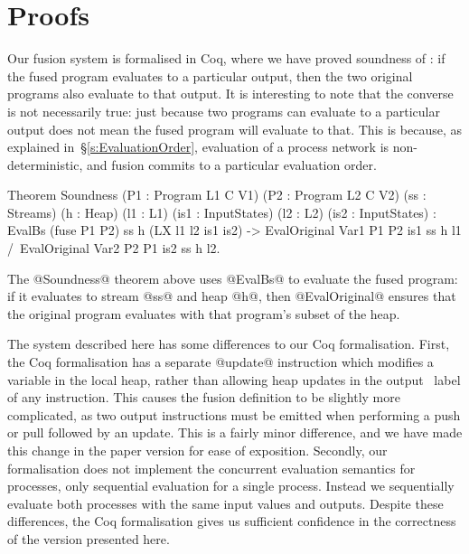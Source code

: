 
\section{Proofs}
\label{s:Proofs}

Our fusion system is formalised in Coq, where we have proved soundness of : if the fused program evaluates to a particular output, then the two original programs also evaluate to that output.
It is interesting to note that the converse is not necessarily true: just because two programs can evaluate to a particular output does not mean the fused program will evaluate to that.
This is because, as explained in~\S\ref{s:EvaluationOrder}, evaluation of a process network is non-deterministic, and fusion commits to a particular evaluation order.

\begin{code}
Theorem Soundness (P1 : Program L1 C V1) (P2 : Program L2 C V2) (ss : Streams) (h : Heap)
    (l1 : L1) (is1 : InputStates) (l2 : L2) (is2 : InputStates) :
  EvalBs (fuse P1 P2) ss h (LX l1 l2 is1 is2)
  -> EvalOriginal Var1 P1 P2 is1 ss h l1 /\ EvalOriginal Var2 P2 P1 is2 ss h l2.
\end{code}

The @Soundness@ theorem above uses @EvalBs@ to evaluate the fused program: if it evaluates to stream @ss@ and heap @h@, then @EvalOriginal@ ensures that the original program evaluates with that program's subset of the heap.

The system described here has some differences to our Coq formalisation.
First, the Coq formalisation has a separate @update@ instruction which modifies a variable in the local heap, rather than allowing heap updates in the output \Next~label of any instruction.
This causes the fusion definition to be slightly more complicated, as two output instructions must be emitted when performing a push or pull followed by an update.
This is a fairly minor difference, and we have made this change in the paper version for ease of exposition.
Secondly, our formalisation does not implement the concurrent evaluation semantics for processes, only sequential evaluation for a single process.
Instead we sequentially evaluate both processes with the same input values and outputs.
Despite these differences, the Coq formalisation gives us sufficient confidence in the correctness of the version presented here.

